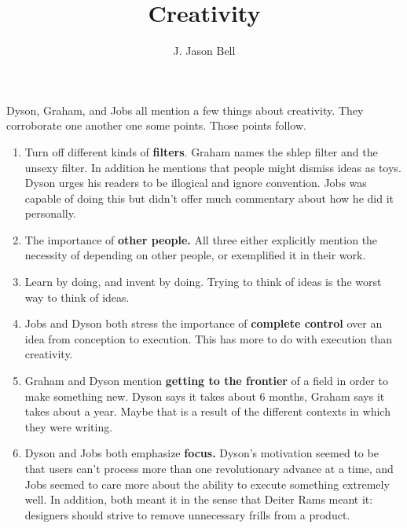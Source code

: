 \documentclass[11pt, oneside]{article}   	%
\title{Creativity}
\author{J. Jason Bell}
\begin{document}
 \maketitle

Dyson, Graham, and Jobs all mention a few things about creativity.  They corroborate one another one some points.  Those points follow.

\begin{enumerate}
\item Turn off different kinds of \textbf{filters}.  Graham names the shlep filter and the unsexy filter.  In addition he mentions that people might dismiss ideas as toys.  Dyson urges his readers to be illogical and ignore convention.  Jobs was capable of doing this but didn't offer much commentary about how he did it personally.

\item The importance of \textbf{other people.}  All three either explicitly mention the necessity of depending on other people, or exemplified it in their work.
\item Learn by doing, and invent by doing.  Trying to think of ideas is the worst way to think of ideas.  

\item Jobs and Dyson both stress the importance of \textbf{complete control} over an idea from conception to execution.  This has more to do with execution than creativity.

\item Graham and Dyson mention \textbf{getting to the frontier} of a field in order to make something new.  Dyson says it takes about 6 months, Graham says it takes about a year.  Maybe that is a result of the different contexts in which they were writing.

\item Dyson and Jobs both emphasize \textbf{focus.}  Dyson's motivation seemed to be that users can't process more than one revolutionary advance at a time, and Jobs seemed to care more about the ability to execute something extremely well.  In addition, both meant it in the sense that Deiter Rams meant it: designers should strive to remove unnecessary frills from a product.


\end{enumerate}
\end{document}
